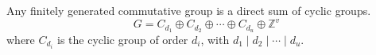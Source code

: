 Any finitely generated commutative group is a direct sum of cyclic groups.
$$G = C_{d_1} \oplus C_{d_2} \oplus \cdots \oplus C_{d_u} \oplus \mathbb{Z}^v$$
where $C_{d_i}$ is the cyclic group of order $d_i$, with $d_1 \mid d_2 \mid \cdots \mid d_u$.

